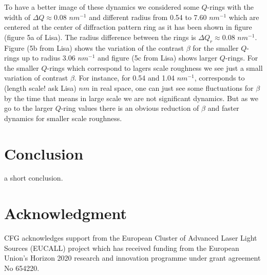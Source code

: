 \documentclass[preprint, 12pt]{elsarticle}
\begin{document}
To have a better image of these dynamics we considered some $Q$-rings with the
width of $\Delta Q \approx 0.08$ $nm^{-1}$ and different radius from 0.54 to
7.60 $nm^{-1}$ which are centered at the center of diffraction pattern ring as
it has been shown in figure (figure 5a of Lisa). The radius difference between
the rings is $\Delta Q_r \approx 0.08$ $nm^{-1}$. Figure (5b from Lisa) shows
the variation of the contrast $\beta$ for the smaller $Q$-rings up to radius
3.06 $nm^{-1}$ and figure (5c from Lisa) shows larger $Q$-rings. For the smaller
$Q$-rings which correspond to lagers scale roughness we see just a small
variation of contrast $\beta$. For instance, for 0.54 and 1.04 $nm^{-1}$,
corresponds to (length scale! ask Lisa) $nm$ in real space, one can just see
some fluctuations for $\beta$ by the time that means in large scale we are not
significant dynamics. But as we go to the larger $Q$-ring values there is an
obvious reduction of $\beta$ and faster dynamics for smaller scale roughness.

\section{Conclusion}

a short conclusion.

\section{Acknowledgment}
CFG acknowledges support from the European Cluster of Advanced Laser Light
Sources (EUCALL) project which has received funding from the European Union’s
Horizon 2020 research and innovation programme under grant agreement No 654220.






\end{document}

